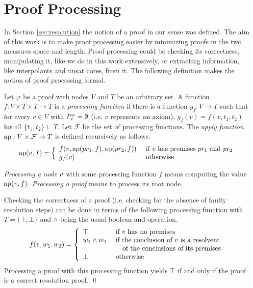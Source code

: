 \section{Proof Processing}
\label{sec:proofprocessing}

In Section \ref{sec:resolution} the notion of a proof in our sense was defined.
The aim of this work is to make proof processing easier by minimizing proofs in the two measures space and length.
Proof processing could be checking its correctness, manipulating it, like we do in this work extensively, or extracting information, like interpolants and unsat cores, from it.
The following definition makes the notion of proof processing formal.

\begin{definition}
\label{def:proof-processing}

Let $\varphi$ be a proof with nodes $V$ and $T$ be an arbitrary set.
A function $f: V \times T \times T \rightarrow T$ is a \emph{processing function} if there is a function $g_f: V \rightarrow T$ such that for every $v \in V$ with $P_{v}^{\varphi} = \emptyset$ (i.e. $v$ represents an axiom), $g_f(v) = f(v,t_1,t_2)$ for all $\{t_1,t_2\} \subseteq T$.
Let $\mathcal{F}$ be the set of processing functions.
The \emph{apply function} $\operatorname{ap}: V \times \mathcal{F} \rightarrow T$ is defined recursively as follows.
$$
\operatorname{ap}(v,f) = \Big\{
\begin{array}{ll}
	f(v,\operatorname{ap}(pr_1,f),\operatorname{ap}(pr_2,f)) &\text{ if } v \text{ has premises } pr_1 \text{ and } pr_2\\
	g_f(v) &\text{ otherwise}\\
\end{array}
$$

\emph{Processing a node} $v$ with some processing function $f$ means computing the value $\operatorname{ap}(v,f)$.
\emph{Processing a proof} means to process its root node.

\end{definition}

\begin{example}

Checking the correctness of a proof (i.e. checking for the absence of faulty resolution steps) can be done in terms of the following processing function with $T = \{\top,\bot\}$ and $\wedge$ being the usual boolean and-operation.
$$
f(v,w_1,w_2) = \left\{
\begin{array}{ll}
	\top & \text{ if $v$ has no premises} \\
	w_1 \wedge w_2 &\text{ if the conclusion of $v$ is a resolvent}\\
								 &\quad \text{ of the conclusions of its premises} \\
	\bot & \text{ otherwise}
\end{array}
\right.
$$
Processing a proof with this processing function yields $\top$ if and only if the proof is a correct resolution proof.
\qed
\end{example}
